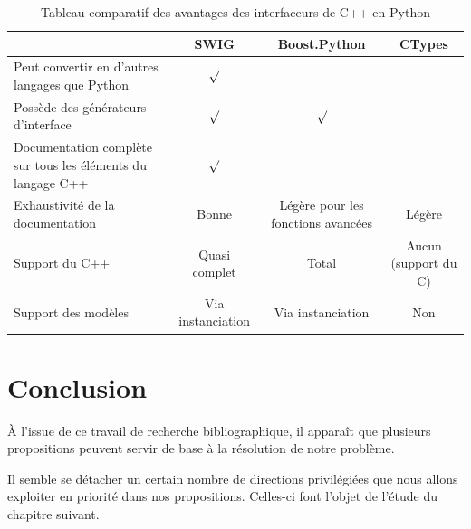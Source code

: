 \documentclass[11pt, french, screen]{report-rd-info}
\begin{document}
\begin{table} %
    \begin{center}
        \begin{tabular}{|p{5cm}||c|c|c|}
            \hline
                                                            & SWIG      & Boost.Python  & CTypes    \\
            \hline
            \hline
Peut convertir en d'autres langages que Python              & $\surd$   &               &           \\
            \hline
Possède des générateurs d'interface                         & $\surd$   & $\surd$       &           \\
            \hline
Documentation complète sur tous les éléments du langage C++ & $\surd$   &               &           \\
            \hline
Exhaustivité de la documentation                            & Bonne      & Légère pour les fonctions avancées          & Légère         \\
            \hline
Support du C++                                              & Quasi complet & Total     & Aucun (support du C)    \\
            \hline
Support des modèles                                       & Via instanciation & Via instanciation & Non \\
            \hline
        \end{tabular}
    \end{center}
    \caption{Tableau comparatif des avantages des interfaceurs de C++ en Python}
    \label{tab:Comparatif}
\end{table}

\section{Conclusion}

À l'issue de ce travail de recherche bibliographique, il apparaît que plusieurs propositions peuvent servir de base à la résolution de notre problème.

Il semble se détacher un certain nombre de directions privilégiées que nous allons exploiter en priorité dans nos propositions. Celles-ci font l'objet de l'étude du chapitre suivant.

\end{document}
